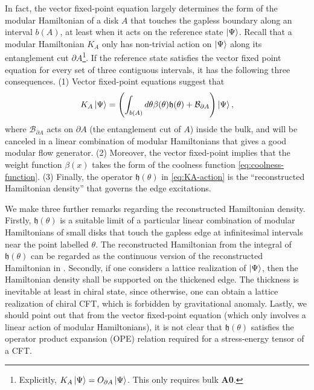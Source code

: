 \documentclass[12pt, nofootinbib]{article}
\theoremstyle{plain}
\theoremstyle{assumption}
\theoremstyle{definition}
\theoremstyle{plain}
\theoremstyle{plain}
\theoremstyle{plain}
\theoremstyle{plain}
\theoremstyle{plain}
\newcommand{\calB}{{\mathcal B}}
\begin{document}
In fact, the vector fixed-point equation largely determines the form of the modular Hamiltonian of a disk $A$ that touches the gapless boundary along an interval $b(A)$, at least when it acts on the reference state $\left|\Psi\right\rangle$. Recall that a modular Hamiltonian $K_A$ only has non-trivial action on $\left|\Psi\right\rangle$ along its entanglement cut $\partial A$\footnote{Explicitly, $K_A\left|\Psi\right\rangle = O_{\partial A}\left|\Psi\right\rangle$. This only requires bulk {\bf A0}.}. 
If the reference state satisfies the vector fixed point equation for every set of three contiguous intervals, it has the following three consequences. (1) Vector fixed-point equations suggest that  
\begin{equation}\label{eq:KA-action}
    K_A\ket{\Psi} = \left( \int_{b(A)} d\theta \beta(\theta)\mathfrak{h}(\theta) + \calB_{\partial A}\right) \ket{\Psi},
\end{equation}
where $\calB_{\partial A}$ acts on $\partial A$ (the entanglement cut of $A$) inside the bulk, and will be canceled in a linear combination of modular Hamiltonians that gives a good modular flow generator.
(2) Moreover, the vector fixed-point implies that the weight function $\beta(x)$ takes the form of the coolness function \eqref{eq:coolness-function}. (3) Finally, the operator $\mathfrak{h}(\theta)$ in \eqref{eq:KA-action} is the ``reconstructed Hamiltonian density'' \cite{Lin2023} that governs the edge excitations. 

We make three further remarks regarding the reconstructed Hamiltonian density. Firstly, $\mathfrak{h}(\theta)$ is a suitable limit of a particular linear combination of modular Hamiltonians of small disks that touch the gapless edge at infinitesimal intervals near the point labelled $\theta$. The reconstructed Hamiltonian from the integral of $\mathfrak{h}(\theta)$ can be regarded as the continuous version of the reconstructed Hamiltonian in \cite{Lin2023}. Secondly, if one considers a lattice realization of $\left|\Psi\right\rangle$, then the Hamiltonian density shall be supported on the thickened edge. The thickness is inevitable at least in chiral state, since otherwise, one can obtain a lattice realization of chiral CFT, which is forbidden by gravitational anomaly. Lastly, we should point out that from the vector fixed-point equation (which only involves a linear action of modular Hamiltonians), it is not clear that $\mathfrak{h}(\theta)$ satisfies the operator product expansion (OPE) relation required for a stress-energy tensor of a CFT.  

\end{document}
